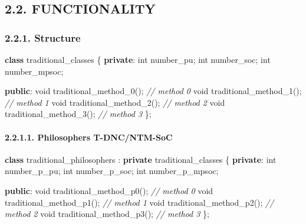 \documentclass[]{article}
\newenvironment{Shaded}{}{}
\newcommand{\KeywordTok}[1]{\textcolor[rgb]{0.00,0.44,0.13}{\textbf{#1}}}
\newcommand{\DataTypeTok}[1]{\textcolor[rgb]{0.56,0.13,0.00}{#1}}
\newcommand{\CommentTok}[1]{\textcolor[rgb]{0.38,0.63,0.69}{\textit{#1}}}
\newcommand{\NormalTok}[1]{#1}
\let\oldparagraph\paragraph
\renewcommand{\paragraph}[1]{\oldparagraph{#1}\mbox{}}
\begin{document}
\subsection{2.2. FUNCTIONALITY}\label{functionality}

\subsubsection{2.2.1. Structure}\label{structure}

\begin{Shaded}
\begin{Highlighting}[]
\KeywordTok{class}\NormalTok{ traditional_classes \{}
   \KeywordTok{private}\NormalTok{:}
      \DataTypeTok{int}\NormalTok{ number_pu;}
      \DataTypeTok{int}\NormalTok{ number_soc;}
      \DataTypeTok{int}\NormalTok{ number_mpsoc;}

   \KeywordTok{public}\NormalTok{:}
      \DataTypeTok{void}\NormalTok{ traditional_method_0();  }\CommentTok{// method 0}
      \DataTypeTok{void}\NormalTok{ traditional_method_1();  }\CommentTok{// method 1}
      \DataTypeTok{void}\NormalTok{ traditional_method_2();  }\CommentTok{// method 2}
      \DataTypeTok{void}\NormalTok{ traditional_method_3();  }\CommentTok{// method 3}
\NormalTok{\};}
\end{Highlighting}
\end{Shaded}

\paragraph{2.2.1.1. Philosophers
T-DNC/NTM-SoC}\label{philosophers-t-dncntm-soc}

\begin{Shaded}
\begin{Highlighting}[]
\KeywordTok{class}\NormalTok{ traditional_philosophers : }\KeywordTok{private}\NormalTok{ traditional_classes \{}
   \KeywordTok{private}\NormalTok{:}
      \DataTypeTok{int}\NormalTok{ number_p_pu;}
      \DataTypeTok{int}\NormalTok{ number_p_soc;}
      \DataTypeTok{int}\NormalTok{ number_p_mpsoc;}

   \KeywordTok{public}\NormalTok{:}
      \DataTypeTok{void}\NormalTok{ traditional_method_p0();  }\CommentTok{// method 0}
      \DataTypeTok{void}\NormalTok{ traditional_method_p1();  }\CommentTok{// method 1}
      \DataTypeTok{void}\NormalTok{ traditional_method_p2();  }\CommentTok{// method 2}
      \DataTypeTok{void}\NormalTok{ traditional_method_p3();  }\CommentTok{// method 3}
\NormalTok{\};}
\end{Highlighting}
\end{Shaded}
\end{document}
